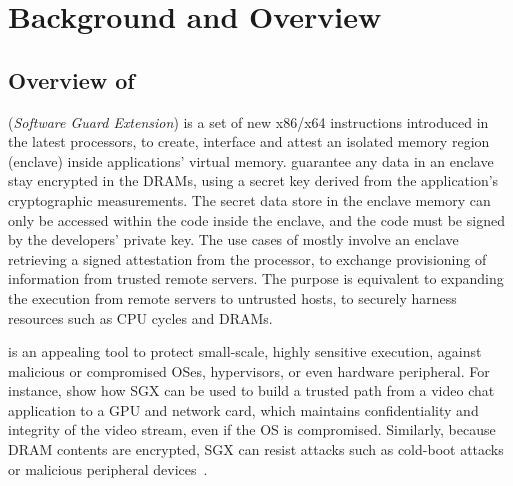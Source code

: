\section{Background and Overview}
\label{sec:gsgx:background}

\subsection{Overview of \intel{} \sgx{}}
\label{sec:gsgx:background:sgx}


\intel{} \sgx{} ({\it Software Guard Extension})
is a set of new x86/x64 instructions
introduced in the latest \intel{} \skylake{} processors,
to create, interface and attest
an isolated memory region (enclave) inside applications' virtual memory.
\sgx{} guarantee any data in an enclave
stay encrypted in the DRAMs, using a secret key derived from
the application's cryptographic measurements.
The secret data store in the enclave memory
can only be accessed within the code inside the enclave,
and the code must be signed by the developers' private key.
The use cases of \sgx{} mostly involve an enclave
retrieving a signed attestation from the \intel{} processor,
to exchange provisioning of information from trusted remote servers.
The purpose is equivalent to
expanding the execution from remote servers
to untrusted hosts,
to securely harness resources such as CPU cycles and DRAMs.

\sgx{} is an appealing tool to protect small-scale, highly sensitive execution, 
against malicious or compromised OSes, hypervisors, or even hardware peripheral.
For instance, \cite{hoekstra13sgx} show how SGX can be used
to build a trusted path from a video chat application to a GPU and network card, which maintains confidentiality and integrity of the
video stream, even if the OS is compromised.
Similarly, because DRAM contents are encrypted, SGX can resist attacks such as cold-boot attacks~\citep{halderman09coldboot} or 
malicious peripheral devices~\citep{hudson15thunderstrike}.

